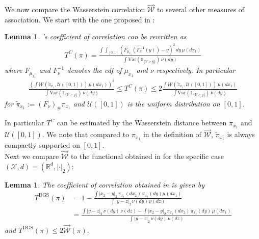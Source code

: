 \documentclass[10pt]{amsart}
\newtheorem{lemma}[theorem]{Lemma}
\newcommand{\R}{\mathbb{R}}
\begin{document}
We now compare the Wasserstein correlation $\overrightarrow{\mathcal{W}}$ to several other measures of association. We start with the one proposed in \cite{trutschnig2011strong, dette2013copula, chatterjee2020new, junker2021estimating}:

\begin{lemma}\label{lem:chatterjee}
\cite{trutschnig2011strong, dette2013copula, chatterjee2020new, junker2021estimating}'s coefficient of correlation can be rewritten as
\begin{align*}
T^C(\pi)=\frac{ \int \int_{[0,1]} \left( F_{\mu_{x_1}}(F^{-1}_\nu(y))-y \right)^2\,dy\,\mu(dx_1)}{\int \mathrm{Var}\left( \mathds{1}_{\{Y\ge y\}}\right)\,\nu(dy)}
\end{align*}
where $F_{\mu_{x_1}}$ and $F^{-1}_\nu$ denotes the cdf of $\mu_{x_1}$ and $\nu$ respectively. In particular
\begin{align*}
\frac{\left(\int \mathcal{W}(\tilde{\pi}_{x_1}, \mathcal{U}([0,1]))\,\mu(dx_1)\right)^2}{\int \mathrm{Var}\left( \mathds{1}_{\{Y\ge y\}}\right)\,\nu(dy)} \le T^C(\pi)\le 2\frac{\int \mathcal{W}(\tilde{\pi}_{x_1}, \mathcal{U}([0,1]))\,\mu(dx_1)}{\int \mathrm{Var}\left( \mathds{1}_{\{Y\ge y\}}\right)\,\nu(dy)}
\end{align*}
for $\tilde{\pi}_{x_1}:=(F_\nu)_{\#}\pi_{x_1}$ and $\mathcal{U}([0,1])$ is the uniform distribution on $[0,1]$.
\end{lemma}

In particular $T^C$ can be estimated by the Wasserstein distance between $\tilde{\pi}_{x_1}$ and $\mathcal{U}([0,1])$. We note that compared to $\pi_{x_1}$ in the definition of $\overrightarrow{\mathcal{W}}$, $\tilde{\pi}_{x_1}$ is always compactly supported on $[0,1]$.\\

Next we compare $\overrightarrow{\mathcal{W}}$ to the functional obtained in \cite{deb2020kernel} for the specific case $(\mathcal{X},d)=(\R^d, |\cdot|_2)$:

\begin{lemma}\label{rem:1}
The coefficient of correlation obtained in  \cite{deb2020kernel} is given by
\begin{align*}
T^{\mathrm{DGS}}(\pi)&=1-\frac{\int |x_2-y|_2 \,\pi_{x_1}(dx_2)\,\pi_{x_1}(dy)\mu(dx_1)}{\int |y-z|_2 \,\nu(dy)\,\nu(dz)}\\
&= \frac{ \int |y-z|_2 \,\nu(dy)\,\nu(dz) - \int |x_2-y|_2 \,\pi_{x_1}(dx_2)\,\pi_{x_1}(dy)\,\mu(dx_1)}{\int |y-z|_2 \,\nu(dy)\,\nu(dz)}
\end{align*}
and $T^{\mathrm{DGS}}(\pi)\le 2\overrightarrow{\mathcal{W}}(\pi).$
\end{lemma}
\end{document}
